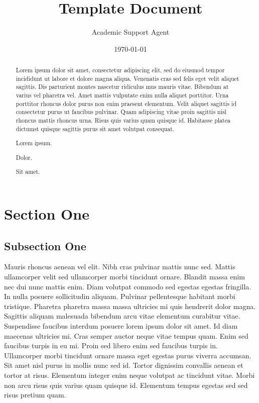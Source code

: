 \documentclass{article}
\title{Template Document}
\author{Academic Support Agent}
\date{\today}
\begin{document}
\maketitle

\maketitle

\thispagestyle{pagefirst}

\begin{abstract}
Lorem ipsum dolor sit amet, consectetur adipiscing elit, sed do eiusmod tempor incididunt ut labore et dolore magna aliqua. Venenatis cras sed felis eget velit aliquet sagittis. Dis parturient montes nascetur ridiculus mus mauris vitae. Bibendum at varius vel pharetra vel. Amet mattis vulputate enim nulla aliquet porttitor. Urna porttitor rhoncus dolor purus non enim praesent elementum. Velit aliquet sagittis id consectetur purus ut faucibus pulvinar. Quam adipiscing vitae proin sagittis nisl rhoncus mattis rhoncus urna.\cite{Nakamoto2008} Risus quis varius quam quisque id. Habitasse platea dictumst quisque sagittis purus sit amet volutpat consequat.

\begin{keywords}
\item Lorem ipsum.
\item Dolor.
\item Sit amet.
\end{keywords}
\end{abstract}

\section{Section One}
\subsection{Subsection One}
Mauris rhoncus aenean vel elit.\cite{Smith} Nibh cras pulvinar mattis nunc sed. Mattis ullamcorper velit sed ullamcorper morbi tincidunt ornare. Blandit massa enim nec dui nunc mattis enim. Diam volutpat commodo sed egestas egestas fringilla. In nulla posuere sollicitudin aliquam. Pulvinar pellentesque habitant morbi tristique. Pharetra pharetra massa massa ultricies mi quis hendrerit dolor magna. Sagittis aliquam malesuada bibendum arcu vitae elementum curabitur vitae. Suspendisse faucibus interdum posuere lorem ipsum dolor sit amet. Id diam maecenas ultricies mi. Cras semper auctor neque vitae tempus quam. Enim sed faucibus turpis in eu mi. Proin sed libero enim sed faucibus turpis in. Ullamcorper morbi tincidunt ornare massa eget egestas purus viverra accumsan. Sit amet nisl purus in mollis nunc sed id. Tortor dignissim convallis aenean et tortor at risus. Elementum integer enim neque volutpat ac tincidunt vitae. Morbi non arcu risus quis varius quam quisque id. Elementum tempus egestas sed sed risus pretium quam.
\end{document}
